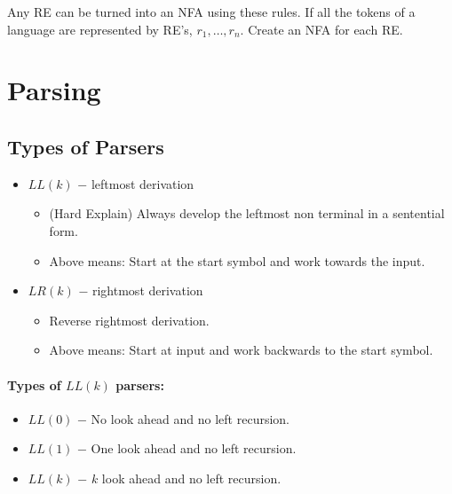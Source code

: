 \documentclass[twocolumn]{article}
\begin{document}


Any RE can be turned into an NFA using these rules.
If all the tokens of a language are represented by RE's, $r_1, \dots, r_n$.
Create an NFA for each RE\@.


\section{Parsing}

\subsection{Types of Parsers}

\begin{itemize}
  \item $LL(k)$ $-$ leftmost derivation
        \begin{itemize}
          \item (Hard Explain) Always develop the leftmost non terminal in a sentential form.
          \item Above means: Start at the start symbol and work towards the input.
        \end{itemize}
  \item $LR(k)$ $-$ rightmost derivation
        \begin{itemize}
          \item Reverse rightmost derivation.
          \item Above means: Start at input and work backwards to the start symbol.
        \end{itemize}
\end{itemize}

\paragraph*{Types of $LL(k)$ parsers:}

\begin{itemize}
  \item $LL(0)$ $-$ No look ahead and no left recursion.
  \item $LL(1)$ $-$ One look ahead and no left recursion.
  \item $LL(k)$ $-$ $k$ look ahead and no left recursion.
\end{itemize}
\end{document}

